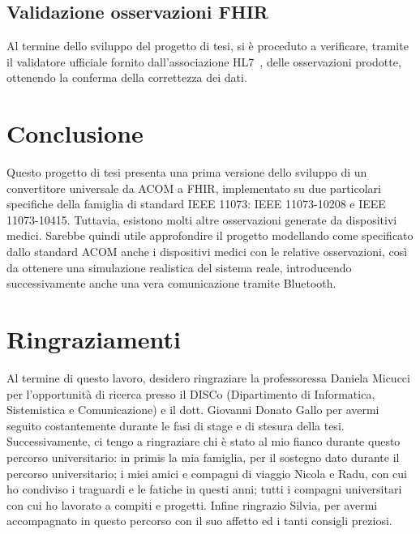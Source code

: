 \documentclass[a4paper]{article}
\begin{document}
\subsection{Validazione osservazioni FHIR}
Al termine dello sviluppo del progetto di tesi, si è proceduto a verificare, tramite il validatore ufficiale fornito dall'associazione HL7~\cite{FHIRVALIDATOR}, delle osservazioni prodotte, ottenendo la conferma della correttezza dei dati.
\\
\section{Conclusione}
Questo progetto di tesi presenta una prima versione dello sviluppo di un convertitore universale da ACOM a FHIR, implementato su due particolari specifiche della famiglia di standard IEEE 11073: IEEE 11073-10208 e IEEE 11073-10415.
Tuttavia, esistono molti altre osservazioni generate da dispositivi medici.
Sarebbe quindi utile approfondire il progetto modellando come specificato dallo standard ACOM anche i dispositivi medici con le relative osservazioni, così da ottenere una simulazione realistica del sistema reale, introducendo successivamente anche una vera comunicazione tramite Bluetooth.

\newpage
\printbibliography

\newpage
\section*{Ringraziamenti}
Al termine di questo lavoro, desidero ringraziare la professoressa Daniela Micucci per l’opportunità di
ricerca presso il DISCo (Dipartimento di Informatica, Sistemistica e Comunicazione) e il dott. Giovanni Donato Gallo per avermi seguito costantemente durante le fasi di stage e di stesura della tesi.
Successivamente, ci tengo a ringraziare chi è stato al mio fianco durante questo percorso universitario: in primis la mia famiglia, per il sostegno dato durante il percorso universitario; i miei amici e compagni di viaggio Nicola e Radu, con cui ho condiviso i traguardi e le fatiche in questi anni; tutti i compagni universitari con cui ho lavorato a compiti e progetti.
Infine ringrazio Silvia, per avermi accompagnato in questo percorso con il suo affetto ed i tanti consigli preziosi.
\end{document}
